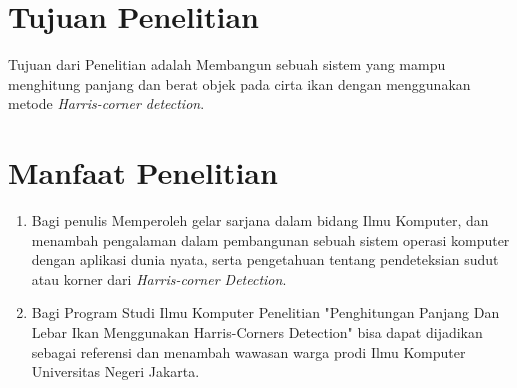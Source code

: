 \section{Tujuan Penelitian}
	Tujuan dari Penelitian adalah Membangun sebuah sistem yang mampu menghitung panjang dan berat objek pada cirta ikan dengan menggunakan metode \emph{Harris-corner detection}. 

\section{Manfaat Penelitian}
\begin{enumerate}
	\item Bagi penulis
	 Memperoleh gelar sarjana dalam bidang Ilmu Komputer, dan menambah pengalaman dalam pembangunan sebuah sistem operasi komputer dengan aplikasi dunia nyata, serta pengetahuan tentang pendeteksian sudut atau korner dari \emph{Harris-corner Detection}. 

		
	\item Bagi Program Studi Ilmu Komputer
	Penelitian "Penghitungan Panjang Dan Lebar Ikan Menggunakan Harris-Corners Detection" bisa dapat dijadikan sebagai referensi dan menambah wawasan warga prodi Ilmu Komputer Universitas Negeri Jakarta.
		
\end{enumerate}

\begin{comment}

\end{comment}
